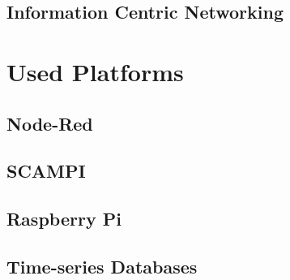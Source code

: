 \subsection{Information Centric Networking}

\section{Used Platforms}
\subsection{Node-Red}
\subsection{SCAMPI}
\subsection{Raspberry Pi}
\subsection{Time-series Databases}


